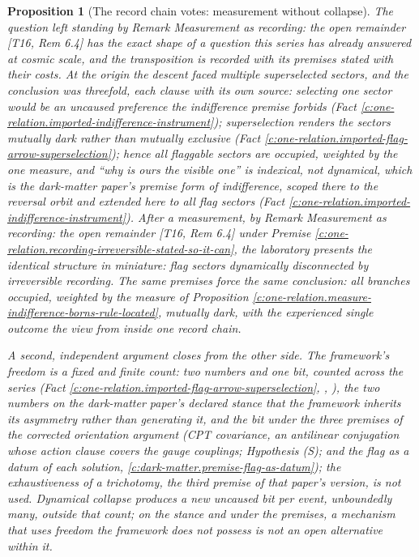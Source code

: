 \documentclass[11pt]{article}
\newtheorem{proposition}[theorem]{Proposition}
\theoremstyle{definition}
\theoremstyle{plain}
\newcommand{\changedmark}[2]{\marginpar{\raggedright\scriptsize\color{#1}#2}}
\begin{document}
\begin{proposition}[The record chain votes: measurement without collapse]\label{c:one-relation.record-chain-votes-measurement-without-collapse}
\changedmark{BrickRed}{corrected since the deposit}
The question left standing by Remark \emph{Measurement as recording: the open remainder} [T16, Rem 6.4] has the exact shape of a question this series has already answered at cosmic scale, and the transposition is recorded with its premises stated with their costs. At the origin the descent faced multiple superselected sectors, and the conclusion was threefold, each clause with its own source: selecting one sector would be an uncaused preference the indifference premise forbids (Fact \ref{c:one-relation.imported-indifference-instrument}); superselection renders the sectors mutually \emph{dark} rather than mutually exclusive (Fact \ref{c:one-relation.imported-flag-arrow-superselection}); hence all flaggable sectors are occupied, weighted by the one measure, and ``why is ours the visible one'' is indexical, not dynamical, which is the dark-matter paper's premise form of indifference, scoped there to the reversal orbit and extended here to all flag sectors (Fact \ref{c:one-relation.imported-indifference-instrument}). After a measurement, by Remark \emph{Measurement as recording: the open remainder} [T16, Rem 6.4] under Premise \ref{c:one-relation.recording-irreversible-stated-so-it-can}, the laboratory presents the identical structure in miniature: flag sectors dynamically disconnected by irreversible recording. The same premises force the same conclusion: all branches occupied, weighted by the measure of Proposition \ref{c:one-relation.measure-indifference-borns-rule-located}, mutually dark, with the experienced single outcome the view from inside one record chain.

A second, independent argument closes from the other side. The framework's freedom is a \emph{fixed and finite count}: two numbers and one bit, counted across the series (Fact \ref{c:one-relation.imported-flag-arrow-superselection}, \cite[Prop.~7.6]{ButlerT12}, \cite[Prop.~5.1, Prop.~5.2]{ButlerT14}), the two numbers on the dark-matter paper's declared stance that the framework inherits its asymmetry rather than generating it, and the bit under the three premises of the corrected orientation argument (CPT covariance, an antilinear conjugation whose action clause covers the gauge couplings; Hypothesis (S); and the flag as a datum of each solution, \ref{c:dark-matter.premise-flag-as-datum}); the exhaustiveness of a trichotomy, the third premise of that paper's version, is not used. Dynamical collapse produces a new uncaused bit per event, unboundedly many, outside that count; on the stance and under the premises, a mechanism that uses freedom the framework does not possess is not an open alternative within it.


\end{proposition}
\end{document}

